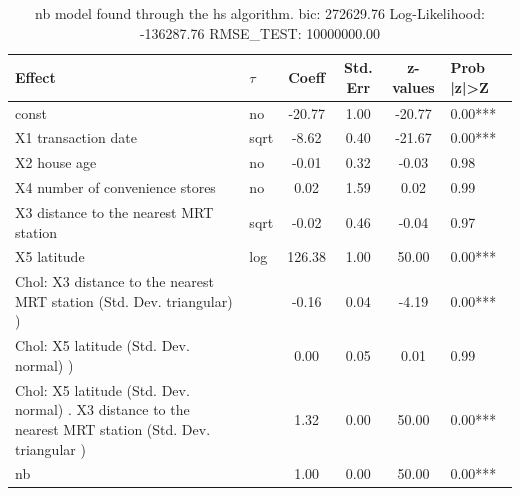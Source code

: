 \begin{table}
	\caption{nb model found through the hs algorithm. bic: 272629.76 Log-Likelihood: -136287.76 RMSE_TEST: 10000000.00}
	\begin{center}
		\begin{tabular}{|l|l|c|c|c|l|}
			\hline
			Effect & $\tau$ & Coeff & Std. Err & z-values & Prob |z|>Z \\
			\hline
			const & no & -20.77 & 1.00 & -20.77 & 0.00*** \\
			\hline
			X1 transaction date & sqrt & -8.62 & 0.40 & -21.67 & 0.00*** \\
			\hline
			X2 house age & no & -0.01 & 0.32 & -0.03 & 0.98 \\
			\hline
			X4 number of convenience stores & no & 0.02 & 1.59 & 0.02 & 0.99 \\
			\hline
			X3 distance to the nearest MRT station & sqrt & -0.02 & 0.46 & -0.04 & 0.97 \\
			\hline
			X5 latitude & log & 126.38 & 1.00 & 50.00 & 0.00*** \\
			\hline
			 Chol: X3 distance to the nearest MRT station (Std. Dev. triangular) ) &  & -0.16 & 0.04 & -4.19 & 0.00*** \\
			\hline
			 Chol: X5 latitude (Std. Dev. normal) ) &  & 0.00 & 0.05 & 0.01 & 0.99 \\
			\hline
			 Chol: X5 latitude (Std. Dev. normal) . X3 distance to the nearest MRT station (Std. Dev.   triangular ) &  & 1.32 & 0.00 & 50.00 & 0.00*** \\
			\hline
			nb &  & 1.00 & 0.00 & 50.00 & 0.00*** \\
			\hline
		\end{tabular}
	\end{center}
\end{table}